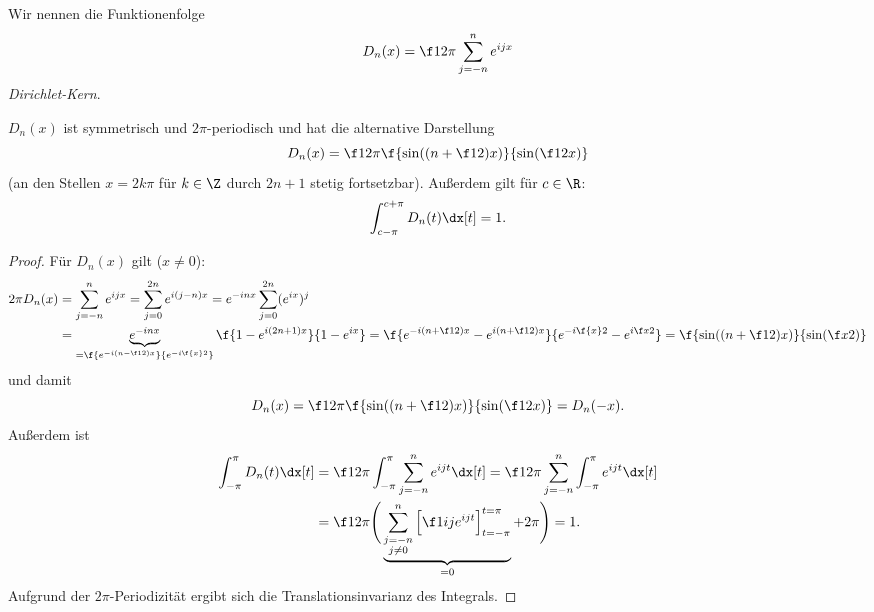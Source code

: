 \begin{nt*}
	Wir nennen die Funktionenfolge
	\[
		D_n(x) = \f 1{2\pi} \sum_{j=-n}^n e^{ijx}
	\]
	\emph{Dirichlet-Kern}.

	$D_n(x)$ ist symmetrisch und $2\pi$-periodisch und hat die alternative Darstellung
	\[
		D_n(x) = \f 1{2\pi} \f {\sin((n+\f 12)x)}{\sin(\f 12 x)}
	\]
	(an den Stellen $x = 2k\pi$ für $k \in \Z$ durch $2n + 1$ stetig fortsetzbar).
	Außerdem gilt für $c \in \R$:
	\begin{align*}
		\int_{c-\pi}^{c+\pi} D_n(t) \dx[t] = 1.
	\end{align*}
	\begin{proof}
		Für $D_n(x)$ gilt ($x \neq 0$):
		\begin{align*}
			2\pi D_n(x)
			&= \sum_{j=-n}^n e^{ijx}
			= \sum_{j=0}^{2n} e^{i(j-n)x}
			= e^{-inx} \sum_{j=0}^{2n} (e^{ix})^{j} \\
			&= \underbrace{e^{-inx}}_{= \f {e^{-i(n-\f 12)x}}{e^{-i \f{x}2}}} \f {1- e^{i(2n+1)x}}{1- e^{ix}}
			= \f {e^{-i(n+\f 12)x} - e^{i (n+\f 12)x}}{e^{-i\f{x}2}-e^{i \f x 2}}
			= \f {\sin((n+ \f 12)x)}{\sin(\f x 2)}
		\end{align*}
		und damit
		\[
			D_n(x) = \f 1{2\pi} \f {\sin((n+\f 12)x)}{\sin(\f 12 x)} = D_n(-x).
		\]
		Außerdem ist
		\begin{align*}
			\int_{-\pi}^\pi D_n(t) \dx[t]
			&= \f 1{2\pi} \int_{-\pi}^\pi \sum_{j=-n}^n e^{ijt} \dx[t]
			= \f 1{2\pi} \sum_{j=-n}^n \int_{-\pi}^\pi e^{ijt} \dx[t] \\
			&= \f 1{2\pi} \Bigg( \underbrace{\sum_{\substack{j=-n \\ j\neq 0}}^n \Big[ \f 1{ij} e^{ijt} \Big]_{t=-\pi}^{t=\pi}}_{= 0} + 2\pi \Bigg)
			= 1.
		\end{align*}
		Aufgrund der $2\pi$-Periodizität ergibt sich die Translationsinvarianz des Integrals.
	\end{proof}
\end{nt*}

